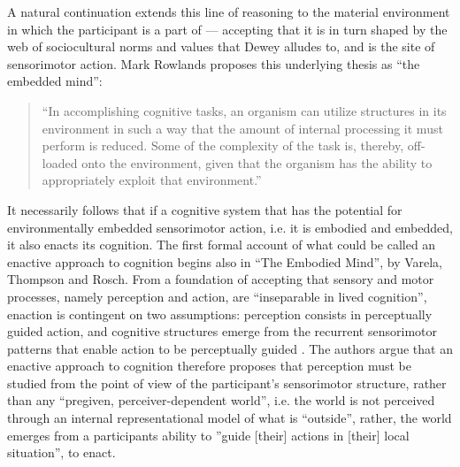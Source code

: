 A natural continuation extends this line of reasoning to the material environment in which the participant is a part of — accepting that it is in turn shaped by the web of sociocultural norms and values that Dewey alludes to, and is the site of sensorimotor action. Mark Rowlands proposes this underlying thesis as “the embedded mind”:
\begin{quote}
    “In accomplishing cognitive tasks, an organism can utilize structures in its environment in such a way that the amount of internal processing it must perform is reduced. Some of the complexity of the task is, thereby, off-loaded onto the environment, given that the organism has the ability to appropriately exploit that environment.” \citeyearpar[p. 68]{rowlands2010}  
\end{quote}
It necessarily follows that if a cognitive system that has the potential for environmentally embedded sensorimotor action, i.e. it is embodied and embedded, it also enacts its cognition. The first formal account of what could be called an enactive approach to cognition begins also in “The Embodied Mind”, by Varela, Thompson and Rosch. From a foundation of accepting that sensory and motor processes, namely perception and action, are “inseparable in lived cognition”, enaction is contingent on two assumptions: perception consists in perceptually guided action, and cognitive structures emerge from the recurrent sensorimotor patterns that enable action to be perceptually guided \citeyearpar[p. 173]{varela1993}. The authors argue that an enactive approach to cognition therefore proposes that perception must be studied from the point of view of the participant’s sensorimotor structure, rather than any “pregiven, perceiver-dependent world”, i.e. the world is not perceived through an internal representational model of what is “outside”, rather, the world emerges from a participants ability to ”guide [their] actions in [their] local situation”, to enact.

